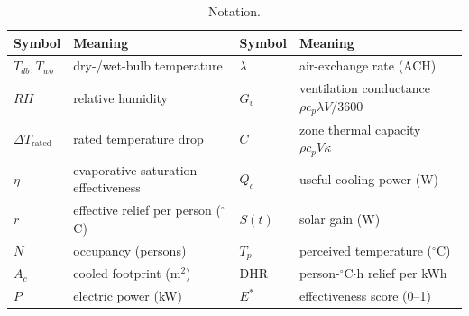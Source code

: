 \documentclass[11pt]{article}
\newcommand{\degrees}{\ensuremath{^\circ}}
\newcommand{\DHR}{\text{DHR}}
\begin{document}
\begin{table}[H]\centering\small
\caption{Notation.}\label{tab:notation}
\begin{tabular}{@{}llll@{}}
\toprule
Symbol & Meaning & Symbol & Meaning\\
\midrule
$T_{db},T_{wb}$ & dry-/wet-bulb temperature & $\lambda$ & air-exchange rate (ACH)\\
$RH$ & relative humidity & $G_v$ & ventilation conductance $\rho c_p\lambda V/3600$\\
$\Delta T_{\text{rated}}$ & rated temperature drop & $C$ & zone thermal capacity $\rho c_p V\kappa$\\
$\eta$ & evaporative saturation effectiveness & $Q_c$ & useful cooling power (W)\\
$r$ & effective relief per person ($\degrees$C) & $S(t)$ & solar gain (W)\\
$N$ & occupancy (persons) & $T_p$ & perceived temperature ($\degrees$C)\\
$A_c$ & cooled footprint (m$^2$) & $\DHR$ & person-$\degrees$C$\cdot$h relief per kWh\\
$P$ & electric power (kW) & $E^\ast$ & effectiveness score (0--1)\\
\bottomrule
\end{tabular}
\end{table}
\end{document}
